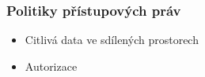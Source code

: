 






\begin{frame}
    \frametitle{Politiky přístupových práv}
    \begin{itemize}
        \item Citlivá data ve sdílených prostorech
        \item Autorizace
    \end{itemize}
\end{frame}

